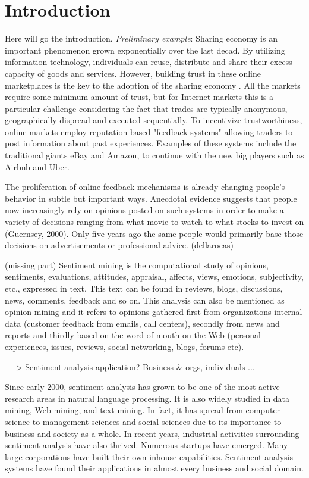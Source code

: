 \documentclass[a4paper, 11pt]{article}
\begin{document}
\section*{Introduction}

Here will go the introduction. \textit{Preliminary example}: Sharing economy is an important phenomenon grown exponentially over the last decad. By utilizing information technology, individuals can reuse, distribute and share their excess capacity of goods and services. However, building trust in these online marketplaces is the key to the adoption of the sharing economy \cite{owen2014trust}. All the markets require some minimum amount of trust, but for Internet markets this is a particular challenge considering the fact that trades are typically anonymous, geographically dispread and executed sequentially. To incentivize trustworthiness, online markets employ reputation based "feedback systems" allowing traders to post information about past experiences. Examples of these systems include the traditional giants eBay and Amazon, to continue with the new big players such as Airbnb and Uber.

The proliferation of online feedback mechanisms is already changing people’s behavior in subtle
but important ways. Anecdotal evidence suggests that people now increasingly rely on opinions
posted on such systems in order to make a variety of decisions ranging from what movie to
watch to what stocks to invest on (Guernsey, 2000). Only five years ago the same people would
primarily base those decisions on advertisements or professional advice. (dellarocas) %

(missing part)
Sentiment mining is the computational study of opinions, sentiments, evaluations, attitudes, appraisal, affects, views, emotions, subjectivity, etc., expressed in text. This text can be found in reviews, blogs, discussions, news, comments, feedback and so on. This analysis can also be mentioned as opinion mining and it refers to opinions gathered first from organizations internal data (customer feedback from emails, call centers), secondly from news and reports and thirdly based on the word-of-mouth on the Web (personal experiences, issues, reviews, social networking, blogs, forums etc). 

----> Sentiment analysis application? Business \& orgs, individuals ...

Since early 2000, sentiment analysis has grown to be one of the most
active research areas in natural language processing. It is also widely studied
in data mining, Web mining, and text mining. In fact, it has spread from
computer science to management sciences and social sciences due to its
importance to business and society as a whole. In recent years, industrial
activities surrounding sentiment analysis have also thrived. Numerous
startups have emerged. Many large corporations have built their own inhouse
capabilities. Sentiment analysis systems have found their applications
in almost every business and social domain.
\end{document}
